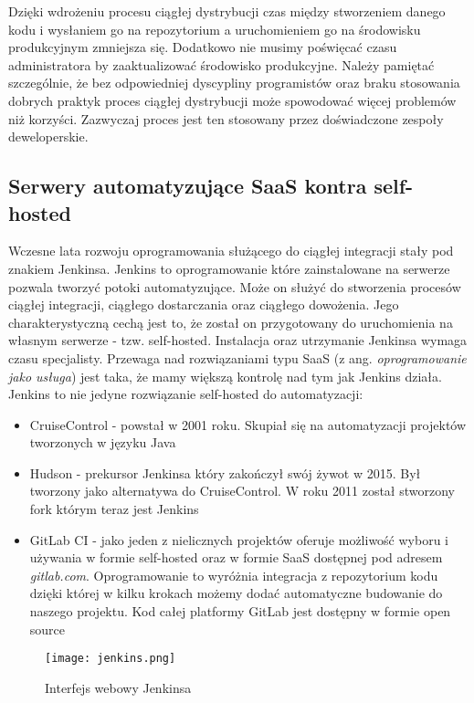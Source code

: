 Dzięki wdrożeniu procesu ciągłej dystrybucji czas między stworzeniem danego kodu i wysłaniem go na repozytorium a uruchomieniem go na środowisku produkcyjnym zmniejsza się. Dodatkowo nie musimy poświęcać czasu administratora by zaaktualizować środowisko produkcyjne. Należy pamiętać szczególnie, że bez odpowiedniej dyscypliny programistów oraz braku stosowania dobrych praktyk proces ciągłej dystrybucji może spowodować więcej problemów niż korzyści. Zazwyczaj proces jest ten stosowany przez doświadczone zespoły deweloperskie.
\subsection{Serwery automatyzujące SaaS kontra self-hosted}
Wczesne lata rozwoju oprogramowania służącego do ciągłej integracji stały pod znakiem Jenkinsa. Jenkins to oprogramowanie które zainstalowane na serwerze pozwala tworzyć potoki automatyzujące. Może on służyć do stworzenia procesów ciągłej integracji, ciągłego dostarczania oraz ciągłego dowożenia. Jego charakterystyczną cechą jest to, że został on przygotowany do uruchomienia na własnym serwerze - tzw. self-hosted. Instalacja oraz utrzymanie Jenkinsa wymaga czasu specjalisty. Przewaga nad rozwiązaniami typu SaaS (z ang. \textit{oprogramowanie jako usługa}) jest taka, że mamy większą kontrolę nad tym jak Jenkins działa.
Jenkins to nie jedyne rozwiązanie self-hosted do automatyzacji:
\begin{itemize}
    \item CruiseControl - powstał w 2001 roku. Skupiał się na automatyzacji projektów tworzonych w języku Java
    \item Hudson - prekursor Jenkinsa który zakończył swój żywot w 2015. Był tworzony jako alternatywa do CruiseControl. W roku 2011 został stworzony fork którym teraz jest Jenkins
    \item GitLab CI - jako jeden z nielicznych projektów oferuje możliwość wyboru i używania w formie self-hosted oraz w formie SaaS dostępnej pod adresem \textit{gitlab.com}. Oprogramowanie to wyróżnia integracja z repozytorium kodu dzięki której w kilku krokach możemy dodać automatyczne budowanie do naszego projektu. Kod całej platformy GitLab jest dostępny w formie open source
\end{itemize}
\begin{figure}[htbp]
    \centering
    \texttt{[image: jenkins.png]}
    \caption{Interfejs webowy Jenkinsa}
    \label{fig:jenkins}
\end{figure}
\par
